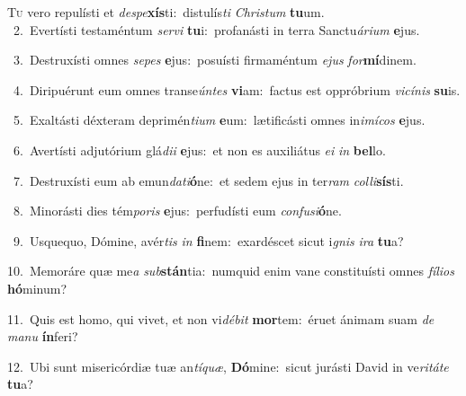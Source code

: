 \lettrine{\initial\textcolor{\initialcolor}{T}}{u} vero repulísti et \textit{de}\-\textit{spe}\textbf{xís}ti:~\star distulís\textit{ti} \textit{Chris}\-\textit{tum} \textbf{tu}\-um.\\
{\numbfont\textcolor{\numbcolor}{~2.}}~Evertísti testaméntum \textit{ser}\-\textit{vi} \textbf{tu}\-i:~\star profanásti in terra Sanctu\-\textit{á}\-\textit{ri}\textit{um} \textbf{e}\-jus.\par
{\numbfont\textcolor{\numbcolor}{~3.}}~Destruxísti omnes \textit{se}\-\textit{pes} \textbf{e}\-jus:~\star posuísti firmaméntum \textit{e}\-\textit{jus} \textit{for}\-\textbf{mí}dinem.\par
{\numbfont\textcolor{\numbcolor}{~4.}}~Diripuérunt eum omnes transe\-\textit{ún}\-\textit{tes} \textbf{vi}\-am:~\star factus est oppróbrium \textit{vi}\-\textit{cí}\textit{nis} \textbf{su}\-is.\par
{\numbfont\textcolor{\numbcolor}{~5.}}~Exaltásti déxteram deprimén\-\textit{ti}\-\textit{um} \textbf{e}\-um:~\star lætificásti omnes in\-\textit{i}\-\textit{mí}\textit{cos} \textbf{e}\-jus.\par
{\numbfont\textcolor{\numbcolor}{~6.}}~Avertísti adjutórium glá\-\textit{di}\-\textit{i} \textbf{e}\-jus:~\star et non es auxiliátus \textit{e}\-\textit{i} \textit{in} \textbf{bel}\-lo.\par
{\numbfont\textcolor{\numbcolor}{~7.}}~Destruxísti eum ab emun\-\textit{da}\-\textit{ti}\textbf{ó}ne:~\star et sedem ejus in ter\textit{ram} \textit{col}\-\textit{li}\textbf{sís}ti.\par
{\numbfont\textcolor{\numbcolor}{~8.}}~Minorásti dies tém\-\textit{po}\-\textit{ris} \textbf{e}\-jus:~\star perfudísti eum \textit{con}\-\textit{fu}\textit{si}\textbf{ó}ne.\par
{\numbfont\textcolor{\numbcolor}{~9.}}~Usquequo, Dómine, avér\textit{tis} \textit{in} \textbf{fi}\-nem:~\star exardéscet sicut i\textit{gnis} \textit{i}\-\textit{ra} \textbf{tu}\-a?\par
{\numbfont\textcolor{\numbcolor}{10.}}~Memoráre quæ me\textit{a} \textit{sub}\-\textbf{stán}tia:~\star numquid enim vane constituísti omnes \textit{fí}\-\textit{li}\textit{os} \textbf{hó}\-minum?\par
{\numbfont\textcolor{\numbcolor}{11.}}~Quis est homo, qui vivet, et non vi\-\textit{dé}\-\textit{bit} \textbf{mor}\-tem:~\star éruet ánimam suam \textit{de} \textit{ma}\-\textit{nu} \textbf{ín}\-feri?\par
{\numbfont\textcolor{\numbcolor}{12.}}~Ubi sunt misericórdiæ tuæ an\-\textit{tí}\-\textit{quæ}, \textbf{Dó}\-mine:~\star sicut jurásti David in ve\-\textit{ri}\-\textit{tá}\textit{te} \textbf{tu}\-a?\par
